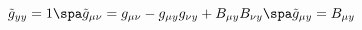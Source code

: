 \begin{equation}
\tilde{g}_{yy} = 1 \spa
\tilde{g}_{\mu \nu} = g_{\mu \nu} - g_{\mu y} g_{\nu y} 
+ B_{\mu y} B_{\nu y}
\spa
\tilde{g}_{\mu y} = B_{\mu y}
\end{equation}

